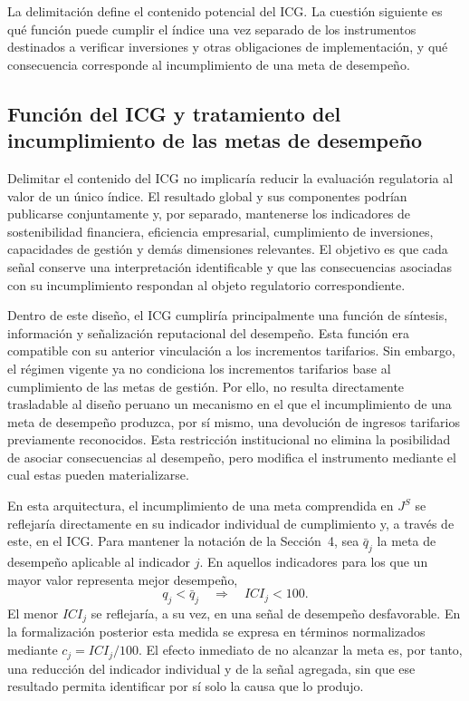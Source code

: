 La delimitación define el contenido potencial del ICG. La cuestión siguiente es qué función puede cumplir el índice una vez separado de los instrumentos destinados a verificar inversiones y otras obligaciones de implementación, y qué consecuencia corresponde al incumplimiento de una meta de desempeño.

\subsection{Función del ICG y tratamiento del incumplimiento de las metas de desempeño}

Delimitar el contenido del ICG no implicaría reducir la evaluación regulatoria al valor de un único índice. El resultado global y sus componentes podrían publicarse conjuntamente y, por separado, mantenerse los indicadores de sostenibilidad financiera, eficiencia empresarial, cumplimiento de inversiones, capacidades de gestión y demás dimensiones relevantes. El objetivo es que cada señal conserve una interpretación identificable y que las consecuencias asociadas con su incumplimiento respondan al objeto regulatorio correspondiente.

Dentro de este diseño, el ICG cumpliría principalmente una función de síntesis, información y señalización reputacional del desempeño. Esta función era compatible con su anterior vinculación a los incrementos tarifarios. Sin embargo, el régimen vigente ya no condiciona los incrementos tarifarios base al cumplimiento de las metas de gestión. Por ello, no resulta directamente trasladable al diseño peruano un mecanismo en el que el incumplimiento de una meta de desempeño produzca, por sí mismo, una devolución de ingresos tarifarios previamente reconocidos. Esta restricción institucional no elimina la posibilidad de asociar consecuencias al desempeño, pero modifica el instrumento mediante el cual estas pueden materializarse.

En esta arquitectura, el incumplimiento de una meta comprendida en \(J^{S}\) se reflejaría directamente en su indicador individual de cumplimiento y, a través de este, en el ICG. Para mantener la notación de la Sección~4, sea \(\bar q_j\) la meta de desempeño aplicable al indicador \(j\). En aquellos indicadores para los que un mayor valor representa mejor desempeño,
\[
q_j<\bar q_j
\quad\Rightarrow\quad
ICI_j<100.
\]
El menor \(ICI_j\) se reflejaría, a su vez, en una señal de desempeño desfavorable. En la formalización posterior esta medida se expresa en términos normalizados mediante \(c_j=ICI_j/100\). El efecto inmediato de no alcanzar la meta es, por tanto, una reducción del indicador individual y de la señal agregada, sin que ese resultado permita identificar por sí solo la causa que lo produjo.


